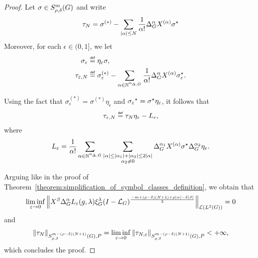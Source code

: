 \begin{proof}
    Let $\sigma \in \SymbolClass m {\rho, \delta}$ and write
    \begin{align*}
        \tau_N
        =
        \sigma^{(*)}
        - \sum_{\abs \alpha \leq N} \frac 1 {\alpha!} \DifferenceOperatorOrder \alpha \TaylorLeftDifferentialOperator \alpha \adj \sigma
    \end{align*}
    Moreover, for each $\epsilon \in (0, 1]$,
    we let
    \begin{align*}
        \sigma_\epsilon &\defeq \eta_\epsilon \sigma,\\
        \tau_{\epsilon, N} &\defeq
        \sigma_\epsilon^{(*)} -
        \sum_{\alpha \in \N^{\dimDifferenceOperators}} \frac 1 {\alpha!} \DifferenceOperatorOrder \alpha \TaylorLeftDifferentialOperator \alpha \adj \sigma_\epsilon.
    \end{align*}

    Using the fact that $\sigma_\epsilon^{(*)} = \sigma^{(*)} \eta_\epsilon$ and $\adj {\sigma_\epsilon} = \adj \sigma \eta_\epsilon$,
    it follows that
    \begin{align*}
        \tau_{\epsilon, N} \defeq \tau_N \eta_\epsilon - L_\epsilon,
    \end{align*}
    where
    \begin{align*}
        L_\epsilon =
        \frac 1 {\alpha!}
        \sum_{\alpha \in \N^{\dimDifferenceOperators}}
        \sum_{\substack{\abs \alpha \leq \abs {\alpha_1} + \abs {\alpha_2} \leq 2 \abs \alpha\\ \alpha_2 \neq 0}}
        \DifferenceOperatorOrder {\alpha_1} \TaylorLeftDifferentialOperator \alpha \adj \sigma \DifferenceOperatorOrder {\alpha_2} \eta_\epsilon.
    \end{align*}

    Arguing like in the proof of Theorem~\ref{theorem:simplification_of_symbol_classes_definition},
    we obtain that
    \begin{align*}
        \liminf_{\epsilon \to 0}
        \norm [\Lin {\Lebesgue 2 \Group}] {%
            \LeftDifferentialOperator \beta \DifferenceOperatorOrder \alpha L_\epsilon(g, \lambda)
            \Rep \lambda \BesselPotential {-m + (\rho - \delta)(N + 1) + \rho \abs \alpha - \delta \abs \beta}
        } = 0
    \end{align*}
    and
    \begin{align*}
        \SymbolSemiNorm {m - (\rho - \delta)(N + 1)} {\rho, \delta} P {\tau_N}
        = \liminf_{\epsilon \to 0}
        \SymbolSemiNorm {m - (\rho - \delta)(N + 1)} {\rho, \delta} P {\tau_{N, \epsilon}} < +\infty,
    \end{align*}
    which concludes the proof.
\end{proof}

